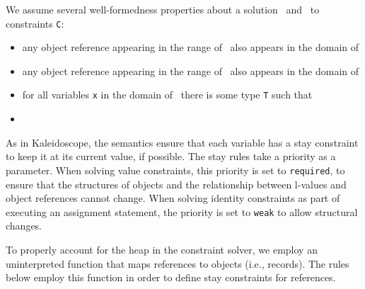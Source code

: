 We assume several well-formedness properties about a solution \Euid\
and \Huid\ to constraints {\tt C}:
\begin{itemize}
  \item any object reference appearing in the range of \Euid\ also
    appears in the domain of \Huid  
 \item any object reference appearing in the range of \Huid\ also
    appears in the domain of \Huid
 \item for all variables {\tt x} in the domain of \Euid\ there is some
   type {\tt T} such that \tcH{\Euid}{\Huid}{x}{T}
 \item {}

\end{itemize}







As in Kaleidoscope, the semantics ensure that each variable has a
 stay constraint to keep it at its current value, if
possible. The stay rules take a priority as a parameter.  When solving
value constraints, this priority is set to {\tt required}, to ensure
that the structures of objects and the relationship between l-values
and object references cannot change.  When solving identity
constraints as part of executing an assignment statement, the priority
is set to {\tt weak} to allow structural changes.

To properly account for the heap in the constraint solver, we employ
an uninterpreted function \texttt{\Huid} that maps references to objects
(i.e., records).  The rules below employ this function in order to
define stay constraints for references.


